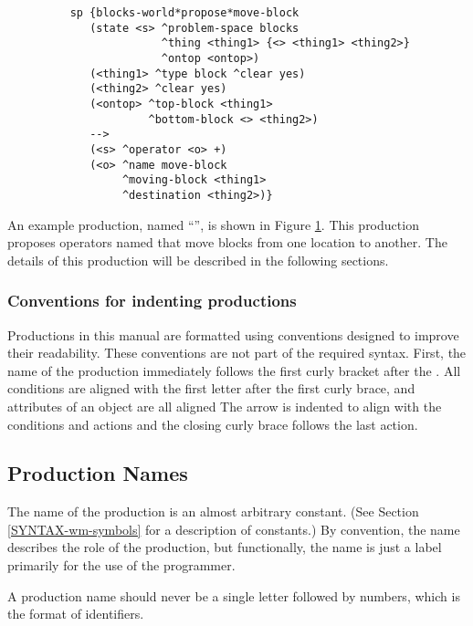 \begin{figure}
	\begin{verbatim}
	sp {blocks-world*propose*move-block
	   (state <s> ^problem-space blocks
	              ^thing <thing1> {<> <thing1> <thing2>}
	              ^ontop <ontop>)
	   (<thing1> ^type block ^clear yes)
	   (<thing2> ^clear yes)
	   (<ontop> ^top-block <thing1>
	            ^bottom-block <> <thing2>)
	   -->
	   (<s> ^operator <o> +)
	   (<o> ^name move-block 
	        ^moving-block <thing1> 
	        ^destination <thing2>)}
	\end{verbatim}
	\label{fig:ex-prod}
\end{figure}

An example production, named ``'', is shown in Figure \ref{fig:ex-prod}. This production proposes operators named  that move blocks from one location to another. The details of this production will be described in the following sections.

\subsubsection*{Conventions for indenting productions}

Productions in this manual are formatted using conventions designed to improve their readability. These conventions are not part of the required syntax. First, the name of the production immediately follows the first curly bracket after the .  All conditions are aligned with the first letter after the first curly brace, and attributes of an object are all aligned The arrow is indented to align with the conditions and actions and the closing curly brace follows the last action.

\subsection{Production Names}

The name of the production is  an almost arbitrary constant. (See Section \ref{SYNTAX-wm-symbols} for a description of constants.) By convention, the name describes the role of the production, but functionally, the name is just a label primarily for the use of the programmer. 

A production name should never be a single letter followed by numbers, which is the format of identifiers.

